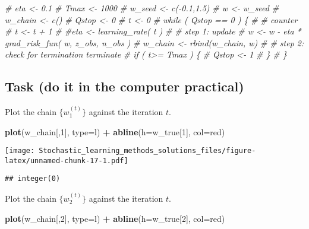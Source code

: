 \documentclass[
]{article}
\newenvironment{Shaded}{\begin{snugshade}}{\end{snugshade}}
\newcommand{\CommentTok}[1]{\textcolor[rgb]{0.56,0.35,0.01}{\textit{#1}}}
\newcommand{\DataTypeTok}[1]{\textcolor[rgb]{0.13,0.29,0.53}{#1}}
\newcommand{\DecValTok}[1]{\textcolor[rgb]{0.00,0.00,0.81}{#1}}
\newcommand{\KeywordTok}[1]{\textcolor[rgb]{0.13,0.29,0.53}{\textbf{#1}}}
\newcommand{\NormalTok}[1]{#1}
\newcommand{\OperatorTok}[1]{\textcolor[rgb]{0.81,0.36,0.00}{\textbf{#1}}}
\newcommand{\StringTok}[1]{\textcolor[rgb]{0.31,0.60,0.02}{#1}}
\begin{document}
\begin{Shaded}
\begin{Highlighting}[]
\CommentTok{\# eta \textless{}{-} 0.1}
\CommentTok{\# Tmax \textless{}{-} 1000}
\CommentTok{\# w\_seed \textless{}{-} c({-}0.1,1.5)}
\CommentTok{\# w \textless{}{-} w\_seed}
\CommentTok{\# w\_chain \textless{}{-} c()}
\CommentTok{\# Qstop \textless{}{-} 0 }
\CommentTok{\# t \textless{}{-} 0}
\CommentTok{\# while ( Qstop == 0 ) \{}
\CommentTok{\#   \# counter}
\CommentTok{\#   t \textless{}{-} t +  1}
\CommentTok{\#   \#eta \textless{}{-} learning\_rate( t )}
\CommentTok{\#   \# step 1: update }
\CommentTok{\#   w \textless{}{-} w {-} eta * grad\_risk\_fun( w, z\_obs, n\_obs )}
\CommentTok{\#   w\_chain \textless{}{-} rbind(w\_chain, w)}
\CommentTok{\#   \# step 2: check for termination terminate}
\CommentTok{\#   if ( t\textgreater{}= Tmax ) \{}
\CommentTok{\#     Qstop \textless{}{-} 1}
\CommentTok{\#   \}}
\CommentTok{\# \}}
\end{Highlighting}
\end{Shaded}

\hypertarget{task-do-it-in-the-computer-practical-3}{%
\subsection{Task (do it in the computer
practical)}\label{task-do-it-in-the-computer-practical-3}}

Plot the chain \(\{w_1^{(t)}\}\) against the iteration \(t\).

\begin{Shaded}
\begin{Highlighting}[]
\KeywordTok{plot}\NormalTok{(w\_chain[,}\DecValTok{1}\NormalTok{], }\DataTypeTok{type=}\StringTok{\textquotesingle{}l\textquotesingle{}}\NormalTok{) }\OperatorTok{+}
\KeywordTok{abline}\NormalTok{(}\DataTypeTok{h=}\NormalTok{w\_true[}\DecValTok{1}\NormalTok{], }\DataTypeTok{col=}\StringTok{\textquotesingle{}red\textquotesingle{}}\NormalTok{)}
\end{Highlighting}
\end{Shaded}

\texttt{[image: Stochastic\_learning\_methods\_solutions\_files/figure-latex/unnamed-chunk-17-1.pdf]}

\begin{verbatim}
## integer(0)
\end{verbatim}

Plot the chain \(\{w_2^{(t)}\}\) against the iteration \(t\).

\begin{Shaded}
\begin{Highlighting}[]
\KeywordTok{plot}\NormalTok{(w\_chain[,}\DecValTok{2}\NormalTok{], }\DataTypeTok{type=}\StringTok{\textquotesingle{}l\textquotesingle{}}\NormalTok{) }\OperatorTok{+}
\KeywordTok{abline}\NormalTok{(}\DataTypeTok{h=}\NormalTok{w\_true[}\DecValTok{2}\NormalTok{], }\DataTypeTok{col=}\StringTok{\textquotesingle{}red\textquotesingle{}}\NormalTok{)}
\end{Highlighting}
\end{Shaded}
\end{document}
